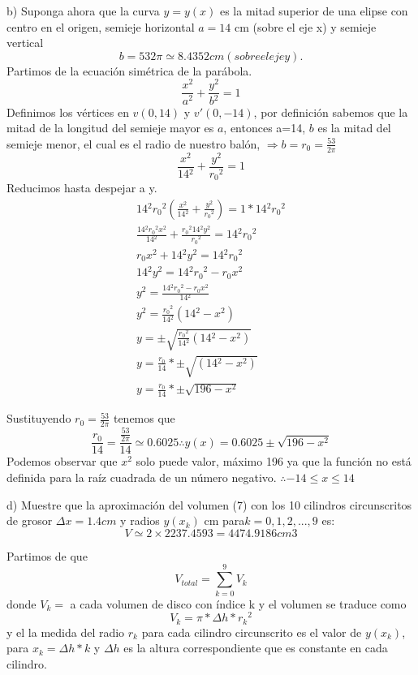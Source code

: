     b) Suponga ahora que la curva $y = y (x)$ es la mitad superior de una elipse con
    centro en el origen, semieje horizontal $a = 14$ cm (sobre el eje x) y semieje vertical
    $$b = 53 2\pi \simeq 8.4352 cm (sobre el eje y).$$
    Partimos de la ecuación simétrica de la parábola.
    $$\frac{x{^2}}{a{^2}}+\frac{y{^2}}{b{^2}}=1$$Definimos los vértices en $v(0,14)$ y $v'(0,-14)$, por definición sabemos que la mitad de la longitud del semieje mayor es $a$, entonces a=14, $b$ es la mitad del semieje menor, el cual es el radio de nuestro balón, $\Rightarrow b=r_{0}=\frac{53}{2\pi}$
    $$\frac{x{^2}}{14{^2}}+\frac{y{^2}}{r_{0}{^2}}=1$$
    Reducimos hasta despejar a y.
    \begin{gather*}
    14{^2}r_{0}{^2}\left( \frac{x{^2}}{14{^2}} +\frac{y{^2}}{r_{0}{^2}}\right)= 1*14{^2}r_{0}{^2}\\
    \frac{14{^2}r_{0}{^2}x{^2}}{14{^2}} +\frac{r_{0}{^2}14{^2}y{^2}}{r_{0}{^2}}=14{^2}r_{0}{^2}\\
    r_{0}x{^2}+14{^2}y{^2}=14{^2}r_{0}{^2}\\
    14{^2}y{^2}=14{^2}r_{0}{^2}-r_{0}x{^2}\\
    y{^2}=\frac{14{^2}r_{0}{^2}-r_{0}x{^2}}{14{^2}}\\
    y{^2}=\frac{r_{0}{^2}}{14{^2}}(14{^2}-x{^2})\\
    y=\pm\sqrt{ \frac{r_{0}{^2}}{14{^2}}(14{^2}-x{^2}) }\\
    y=\frac{r_{0}}{14}*\pm\sqrt{(14{^2}-x{^2})}\\
    y=\frac{r_{0}}{14}*\pm\sqrt{196-x{^2}}
    \end{gather*}
    
    Sustituyendo $r_0=\frac{53}{2\pi}$ tenemos que $$\frac{r_{0}}{14}=\frac{\frac{53}{2\pi}}{14}\simeq 0.6025\therefore y(x)=0.6025\pm \sqrt{ 196-x{^2} }$$
    Podemos observar que $x{^2}$ solo puede valor, máximo 196 ya que la función no está definida para la raíz cuadrada de un número negativo. $\therefore -14\leq x\leq 14$ 
    
    d) Muestre que la aproximación del volumen (7) con los 10 cilindros circunscritos de
    grosor $\Delta x = 1.4 cm$ y radios $y (x_{k})$ cm para$k = 0, 1, 2, . . . , 9$ es:
    $$V \simeq 2 \times 2237.4593 = 4474.9186 cm3$$
    
    Partimos de que 
    $$V_{total}=\sum_{k=0}^{9}V_{k}$$
    donde $V_{k}=$ a cada volumen de disco con índice k y el volumen se traduce como$$V_{k}=\pi*\Delta h*r_{k}{^2}$$
    y el la medida del radio $r_{k}$ para cada cilindro circunscrito es el valor de $y(x_k)$, para $x_{k}=\Delta h*k$
    y $\Delta h$ es la altura correspondiente que es constante en cada cilindro.
    
